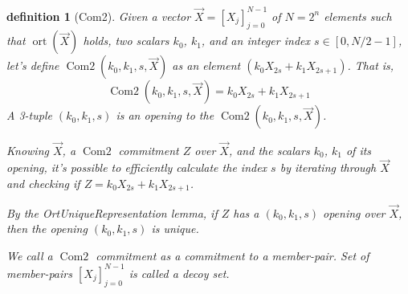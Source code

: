 \documentclass{mathcryptology} %
\DeclareMathOperator{\ort}{ort}
\DeclareMathOperator{\ComTwo}{Com2}
\theoremstyle{title}
\newtheorem*{titledefinition}{definition}
\theoremstyle{titleof}
\begin{document}
    \begin{titledefinition}[Com2]
        Given a vector $\vec{X}={\left[X_{j}\right]}_{j=0}^{N-1}$ of $N=2^{n}$ elements such that $\ort\left( \vec{X}\right)$ holds, two scalars $k_{0}$, $k_{1}$, and an integer index $s\in\left[0,N/2-1\right]$, let's define $\ComTwo\left(k_{0}, k_{1}, s, \vec{X}\right)$ as an element $\left(k_{0} X_{2s} + k_{1} X_{2s+1}\right)$. That is,
        \begin{equation*}
            \ComTwo\left(k_{0}, k_{1}, s, \vec{X}\right) = k_{0} X_{2s} + k_{1} X_{2s+1}
        \end{equation*}
        A 3-tuple $\left(k_{0}, k_{1}, s\right)$ is an opening to the $\ComTwo\left(k_{0}, k_{1}, {s}, \vec{X}\right)$.

        Knowing $\vec{X}$, a $\ComTwo$ commitment $Z$ over $\vec{X}$, and the scalars $k_{0}$, $k_{1}$ of its opening, it's possible to efficiently calculate the index $s$ by iterating through $\vec{X}$ and checking if $Z=k_{0} X_{2s} + k_{1} X_{2s+1}$.

        By the OrtUniqueRepresentation lemma, if $Z$ has a $\left(k_{0}, k_{1}, s\right)$ opening over $\vec{X}$, then the opening $\left(k_{0}, k_{1}, s\right)$ is unique.

        We call a $\ComTwo$ commitment as a commitment to a member-pair. Set of member-pairs ${\left[X_{j}\right]}_{j=0}^{N-1}$ is called a decoy set.
    \end{titledefinition}


\end{document}

